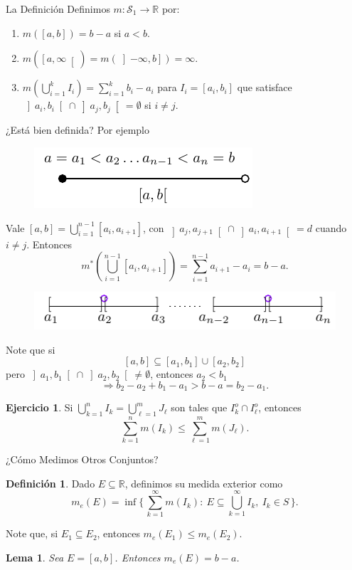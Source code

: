 \documentclass[utf8]{beamer}
\theoremstyle{plain}
\newtheorem{Lem}{Lema}                 %
\theoremstyle{definition}
\newtheorem{Def}{Definición}           %
\newtheorem{Ej}{Ejercicio}             %
\theoremstyle{remark}
\numberwithin{equation}{section}
\newcommand{\bR}{\mathbb{R}}    %
\newcommand{\cS}{\mathcal{S}}           %
\newcommand{\bonj}[1]{\left\lbrack#1\right\rbrack}
\newcommand{\obonj}[1]{\left\rbrack#1\right\lbrack}
\newcommand{\rbonj}[1]{\left\rbrack#1\right\rbrack}
\newcommand{\lbonj}[1]{\left\lbrack#1\right\lbrack}
\newcommand{\Set}[1]{\biggl\{\,#1\,\biggr\}} %
\renewcommand{\l}{\ell}                   %
\renewcommand{\leq}{\leqslant}          %
\newcommand{\To}{\Rightarrow}
\newcommand{\suck}{_{k=1}^\infty} %
\renewcommand{\.}{\Cdot}                %
\begin{document}
\begin{frame}{La Definición}\label{fr:unaPrimeraDefn}
  Definimos $m:\cS_1\to\bR$ por:
  \begin{enumerate}
    \item $m(\bonj{a,b})=b-a$ si $a<b$.
    \item $m(\lbonj{a,\infty})=m(\rbonj{-\infty,b})=\infty$.
    \item $m\left(\bigcup_{i=1}^k I_i\right)=\sum_{i=1}^kb_i-a_i$ para $I_i=[a_i,b_i]$ que satisface $\obonj{a_i,b_i}\cap\obonj{a_j,b_j}=\emptyset$ si $i\neq j$.
  \end{enumerate}
\end{frame}

\begin{frame}{¿Está bien definida?}
  Por ejemplo
  \begin{figure}
    \includegraphics{figs/3/fig3.pdf}
  \end{figure}
  Vale $[a,b]=\bigcup_{i=1}^{n-1}[a_i,a_{i+1}]$, con $\obonj{a_j,a_{j+1}}\cap\obonj{a_i,a_{i+1}}=d$ cuando $i\neq j$. Entonces 
 $$m^\ast\left(\bigcup_{i=1}^{n-1}[a_i,a_{i+1}]\right)=\sum_{i=1}^{n-1}a_{i+1}-a_i=b-a.$$
  \begin{figure}
    \includegraphics{figs/4/fig4.pdf}
  \end{figure}
\end{frame}

\begin{frame}
  Note que si 
  $$[a,b]\subseteq [a_1,b_1]\cup[a_2,b_2]$$
  pero $\obonj{a_1,b_1}\cap \obonj{a_2,b_2}\neq\emptyset$, entonces $a_2<b_1$
  $$\To b_2-a_2+b_1-a_1>b-a=b_2-a_1.$$
  \begin{Ej}\label{ej:medidasYSumas}
Si $\bigcup_{k=1}^nI_k=\bigcup_{\l=1}^mJ_\l$ son tales que $I_k^o\cap I^o_\l$, entonces %
$$\sum_{k=1}^nm(I_k)\leq \sum_{\l=1}^mm(J_\l).$$
  \end{Ej}
\end{frame}

\begin{frame}{¿Cómo Medimos Otros Conjuntos?}
  \begin{Def}\label{def:medidaExterior}
    Dado $E\subseteq\bR$, definimos su \alert{medida exterior} como
    $$m_e(E)=\inf\Set{\sum\suck m(I_k):\ E\subseteq\bigcup\suck I_k,\ I_k\in S}.$$ %
  \end{Def}
  Note que, si $E_1\subseteq E_2$, entonces $m_e(E_1)\leq m_e(E_2)$. 
  \begin{Lem}\label{lem:medidaUnIntervalo}
    Sea $E=[a,b]$. Entonces $m_e(E)=b-a$.
  \end{Lem}
\end{frame}
\end{document}
